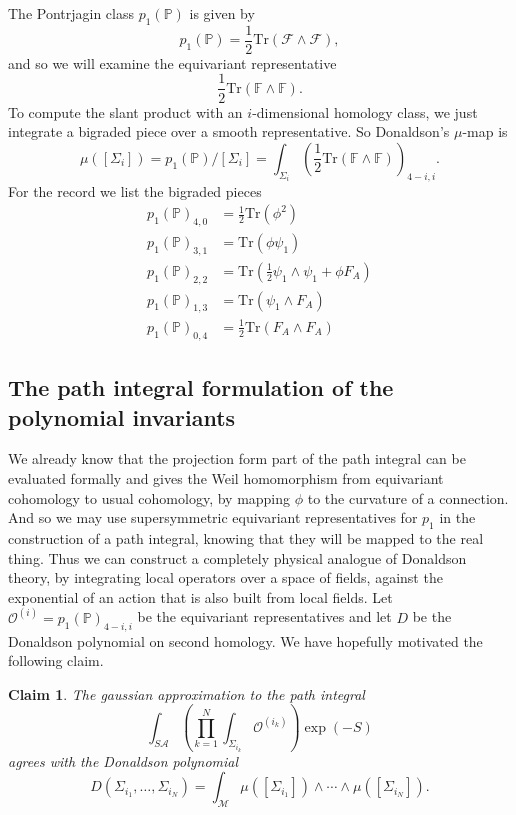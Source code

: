 \documentclass[twoside]{amsart}
\newcommand{\FF}{\ensuremath{\mathbb{F}}}
\newcommand{\PP}{\ensuremath{\mathbb{P}}}
\newtheorem{claim}{Claim}
\newcommand{\enm}[1]{\ensuremath{#1}}
\renewcommand{\aa}{\enm{\mathcal{A}}}
\newcommand{\sa}{\enm{S\aa}}
\newcommand{\oi}[1]{\enm{\mathcal{O}^{(#1)}}}
\newcommand{\mm}{\enm{\mathcal{M}}}
\newcommand{\ff}{\enm{\mathcal{F}}}
\begin{document}
The Pontrjagin class \( p_{1}(\PP) \) is given by
\[ p_{1}(\PP) = \frac{1}{2}\mathrm{Tr}(\ff\wedge\ff), \]
and so we will examine the equivariant representative
\[ \frac{1}{2}\mathrm{Tr}(\FF\wedge\FF). \]
To compute the slant product with an \( i \)-dimensional homology
class,
we just integrate a bigraded piece over a smooth representative. So
Donaldson's \(\mu\)-map is
\[ \mu([\Sigma_{i}]) = p_{1}(\PP)/[\Sigma_{i}] =
   \int_{\Sigma_{i}} \left(\frac{1}{2}\mathrm{Tr}
   (\FF\wedge\FF)\right)_{4-i,i}. \]
For the record we list the bigraded pieces
\begin{align}
    p_{1}(\PP)_{4,0} &=\frac{1}{2} \mathrm{Tr}(\phi^{2}) \\
    p_{1}(\PP)_{3,1} &= \mathrm{Tr}(\phi\psi_{1}) \\
    p_{1}(\PP)_{2,2} &= \mathrm{Tr}\left(\frac{1}{2}\psi_{1}\wedge
    \psi_{1} + \phi F_{A}\right) \\
    p_{1}(\PP)_{1,3} &= \mathrm{Tr}(\psi_{1}\wedge F_{A})\\
    p_{1}(\PP)_{0,4} &= \frac{1}{2}\mathrm{Tr}(F_{A}\wedge F_{A})
\end{align}
\subsection{The path integral formulation of the polynomial invariants}

We already know that the projection form part of the path integral
can be evaluated formally and gives the Weil homomorphism from
equivariant cohomology to usual cohomology, by mapping \( \phi \) to
the curvature of a connection.  And so we may use supersymmetric
equivariant
representatives for \( p_{1} \) in the construction of a path
integral, knowing that they will be mapped to the real thing.  Thus
we can construct a completely physical analogue of Donaldson theory,
by integrating local operators over a space of fields, against the
exponential of an action that is also built from local fields.
Let \( \oi{i} = p_{1}(\PP)_{4-i,i} \) be the equivariant
representatives and let \( D \) be the
Donaldson polynomial on second homology. We have hopefully motivated
the following claim.
\begin{claim} The gaussian approximation to the path integral
    \[
        \int_{\sa}\left(\prod_{k=1}^{N}
	\int_{\Sigma_{i_{k}}}\oi{i_{k}}\right)
	\exp(-S)
    \]
    agrees with the Donaldson polynomial
    \[
    D(\Sigma_{i_{1}}, \ldots, \Sigma_{i_{N}}) =
    \int_{\mm}\mu([\Sigma_{i_{1}}])\wedge\cdots\wedge
    \mu([\Sigma_{i_{N}}]).
    \]
\end{claim}
\end{document}
